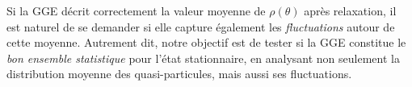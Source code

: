 \medskip
Si la GGE décrit correctement la valeur moyenne de \( \rho(\theta) \) après relaxation, il est naturel de se demander si elle capture également les \emph{fluctuations} autour de cette moyenne. Autrement dit, notre objectif est de tester si la GGE constitue le \textit{bon ensemble statistique} pour l’état stationnaire, en analysant non seulement la distribution moyenne des quasi-particules, mais aussi ses fluctuations.\\




